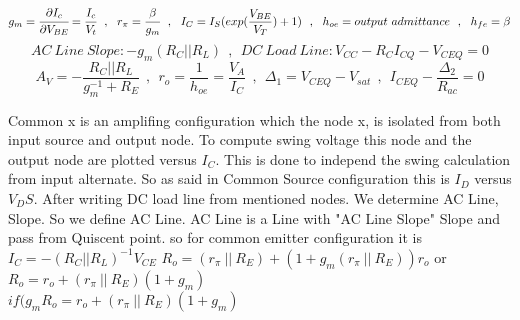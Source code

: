 $$ g_m = \cfrac{\partial I_c}{\partial V_{BE}} = \cfrac{I_c}{V_t} ~~,~~ r_\pi = \cfrac{\beta}{g_m} ~~ , ~~ I_C = I_S ( exp (\dfrac{V_{BE}}{V_T}) + 1)~~ , ~~ h_{oe} = output~admittance ~~ , ~~ h_{fe} = \beta $$
$$AC~Line~Slope:  -g_m ( R_C || R_L )  ~~ , ~~ DC~Load~Line :  V_{CC} - R_C I_{CQ} - V_{CEQ} = 0 $$
$$ A_V = -\dfrac{R_C || R_L}{g_m^{-1} + R_E} ~~ , ~~ r_o = \frac{1}{h_{oe}} = \frac{V_A}{I_C} ~~ , ~~ {\Delta}_1 = V_{CEQ} - V_{sat} ~~ , ~~ I_{CEQ} - \frac{{\Delta}_2}{R_{ac}} = 0 $$
\setlength{\parindent}{0.5cm} %
\par
Common x is an amplifing configuration which the node x, is isolated from both input source and output node. To compute swing voltage this node and the output node are plotted versus $I_C$. This is done to independ the swing calculation from input alternate. So as said in Common Source configuration this is $I_D$ versus $V_DS$. After writing DC load line from mentioned nodes. We determine AC Line, Slope. So we define AC Line. AC Line is a Line with "AC Line Slope" Slope and pass from Quiscent point. so for common emitter configuration it is $ I_C = - ( R_C || R_L )^{-1} V_{CE} $
\lipsum[1-2]
\setlength{\parindent}{0.0cm} 
$ R_o = (r_\pi ~||~ R_E) + ( 1 + g_m (r_\pi ~||~ R_E) )r_o$ or \\
$ R_o = r_o + (r_\pi ~||~ R_E)( 1 + g_m  )$ \\
$ if ( g_m R_o = r_o + (r_\pi ~||~ R_E)( 1 + g_m  )$ \\
\begin{minipage}[t]{.5\textwidth}
\\
\end{minipage}%
\noindent
\setlength{\parindent}{0.0cm} 
\hspace*{-\parindent}%
\begin{minipage}[b]{.5\textwidth}
\raggedleft

\end{minipage}%
